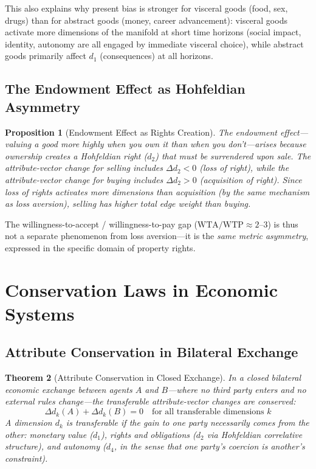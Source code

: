 \documentclass[12pt]{article}
\newtheorem{theorem}{Theorem}[section]
\newtheorem{proposition}[theorem]{Proposition}
\theoremstyle{definition}
\theoremstyle{remark}
\begin{document}
This also explains why present bias is stronger for visceral goods (food, sex, drugs) than for abstract goods (money, career advancement): visceral goods activate more dimensions of the manifold at short time horizons (social impact, identity, autonomy are all engaged by immediate visceral choice), while abstract goods primarily affect $d_1$ (consequences) at all horizons.

\subsection{The Endowment Effect as Hohfeldian Asymmetry}

\begin{proposition}[Endowment Effect as Rights Creation]
\label{prop:endowment}
The endowment effect---valuing a good more highly when you own it than when you don't---arises because ownership creates a Hohfeldian right ($d_2$) that must be \emph{surrendered} upon sale.  The attribute-vector change for selling includes $\Delta d_2 < 0$ (loss of right), while the attribute-vector change for buying includes $\Delta d_2 > 0$ (acquisition of right).  Since loss of rights activates more dimensions than acquisition (by the same mechanism as loss aversion), selling has higher total edge weight than buying.
\end{proposition}

The willingness-to-accept / willingness-to-pay gap ($\text{WTA} / \text{WTP} \approx 2$--$3$) is thus not a separate phenomenon from loss aversion---it is the \emph{same metric asymmetry}, expressed in the specific domain of property rights.


\section{Conservation Laws in Economic Systems}
\label{sec:conservation}

\subsection{Attribute Conservation in Bilateral Exchange}

\begin{theorem}[Attribute Conservation in Closed Exchange]
\label{thm:fairness_conservation}
In a closed bilateral economic exchange between agents $A$ and $B$---where no third party enters and no external rules change---the \emph{transferable} attribute-vector changes are conserved:
\begin{equation}
\Delta d_k(A) + \Delta d_k(B) = 0 \quad \text{for all transferable dimensions } k
\label{eq:fairness_conservation}
\end{equation}
A dimension $d_k$ is \emph{transferable} if the gain to one party necessarily comes from the other: monetary value ($d_1$), rights and obligations ($d_2$ via Hohfeldian correlative structure), and autonomy ($d_4$, in the sense that one party's coercion is another's constraint).
\end{theorem}
\end{document}
